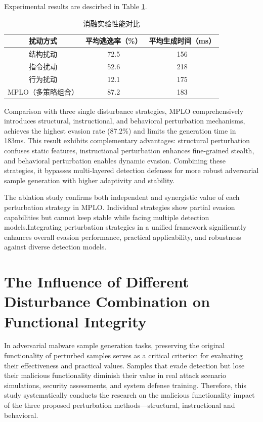 Experimental results are descirbed in Table \ref{tab:5.11}.

\begin{table}[htbp]
	\centering
	\caption{消融实验性能对比}
	\label{tab:5.11}
	\begin{tabular*}{0.9\textwidth}{@{\extracolsep{\fill}}ccc}
		\toprule
		扰动方式 & 平均逃逸率（\%） & 平均生成时间（ms） \\
		\midrule
		结构扰动 & 72.5 & 156 \\
		指令扰动 & 52.6 & 218 \\
		行为扰动 & 12.1 & 175 \\
		MPLO（多策略组合） & 87.2 & 183 \\
		\bottomrule
	\end{tabular*}
\end{table}

Comparison with three single disturbance strategies, MPLO comprehensively introduces structural, instructional, and behavioral perturbation mechanisms, achieves the highest evasion rate (87.2\%) and limits the generation time in 183ms. This result exhibits complementary advantages: structural perturbation confuses static features, instructional perturbation enhances fine-grained stealth, and behavioral perturbation enables dynamic evasion. Combining these strategies, it bypasses multi-layered detection defenses for more robust adversarial sample generation with higher adaptivity and stability.

The ablation study confirms both independent and synergistic value of each perturbation strategy in MPLO. Individual strategies show partial evasion capabilities but cannot keep stable while facing multiple detection models.Integrating perturbation strategies in a unified framework significantly enhances overall evasion performance, practical applicability, and robustness against diverse detection models.  

\section{The Influence of Different Disturbance Combination on Functional Integrity}

In adversarial malware sample generation tasks, preserving the original functionality of perturbed samples serves as a critical criterion for evaluating their effectiveness and practical values. Samples that evade detection but lose their malicious functionality diminish their value in real attack scenario simulations, security assessments, and system defense training. Therefore, this study systematically conducts the research on the malicious functionality impact of the three proposed perturbation methods—structural, instructional and behavioral.

